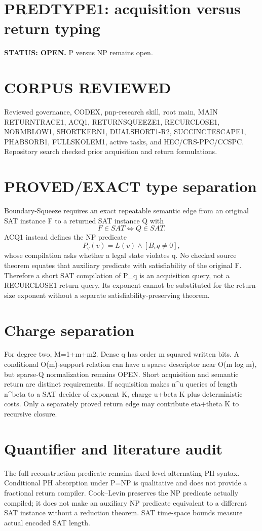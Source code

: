 \documentclass{article}
\begin{document}
\section*{PREDTYPE1: acquisition versus return typing}
\textbf{STATUS: OPEN.} P versus NP remains open.
\section*{CORPUS REVIEWED}
Reviewed governance, CODEX, pnp-research skill, root main, MAIN RETURNTRACE1, ACQ1, RETURNSQUEEZE1, RECURCLOSE1, NORMBLOW1, SHORTKERN1, DUALSHORT1-R2, SUCCINCTESCAPE1, PHABSORB1, FULLSKOLEM1, active tasks, and HEC/CRS-PPC/CCSPC. Repository search checked prior acquisition and return formulations.
\section*{PROVED/EXACT type separation}
Boundary-Squeeze requires an exact repeatable semantic edge from an original SAT instance F to a returned SAT instance Q with
\[F\in SAT\iff Q\in SAT.\]
ACQ1 instead defines the NP predicate
\[P_q(v)=L(v)\wedge[B_vq\ne0],\]
whose compilation asks whether a legal state violates q. No checked source theorem equates that auxiliary predicate with satisfiability of the original F. Therefore a short SAT compilation of P_q is an acquisition query, not a RECURCLOSE1 return query. Its exponent cannot be substituted for the return-size exponent without a separate satisfiability-preserving theorem.
\section*{Charge separation}
For degree two, M=1+m+\binom m2. Dense q has order m squared written bits. A conditional O(m)-support relation can have a sparse descriptor near O(m log m), but sparse-Q normalization remains OPEN. Short acquisition and semantic return are distinct requirements. If acquisition makes n^u queries of length n^beta to a SAT decider of exponent K, charge u+beta K plus deterministic costs. Only a separately proved return edge may contribute eta+theta K to recursive closure.
\section*{Quantifier and literature audit}
The full reconstruction predicate remains fixed-level alternating PH syntax. Conditional PH absorption under P=NP is qualitative and does not provide a fractional return compiler. Cook--Levin preserves the NP predicate actually compiled; it does not make an auxiliary NP predicate equivalent to a different SAT instance without a reduction theorem. SAT time-space bounds measure actual encoded SAT length.
\end{document}
